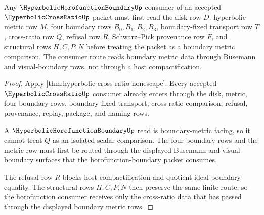 \begin{theorem}
\label{thm:hyperbolic-cross-ratio-horofunction-consumer-route}
Any $\HyperbolicHorofunctionBoundaryUp$ consumer of an accepted $\HyperbolicCrossRatioUp$ packet must first read the disk row $D$, hyperbolic metric row $M$, four boundary rows $B_0,B_1,B_2,B_3$, boundary-fixed transport row $T$, cross-ratio row $Q$, refusal row $R$, Schwarz--Pick provenance row $F$, and structural rows $H,C,P,N$ before treating the packet as a boundary metric comparison. The consumer route reads boundary metric data through Busemann and visual-boundary rows, not through a host compactification.
\end{theorem}
\begin{proof}
Apply \autoref{thm:hyperbolic-cross-ratio-nonescape}. Every accepted $\HyperbolicCrossRatioUp$ consumer already enters through the disk, metric, four boundary rows, boundary-fixed transport, cross-ratio comparison, refusal, provenance, replay, package, and naming rows.

A $\HyperbolicHorofunctionBoundaryUp$ read is boundary-metric facing, so it cannot treat $Q$ as an isolated scalar comparison. The four boundary rows and the metric row must first be routed through the displayed Busemann and visual-boundary surfaces that the horofunction-boundary packet consumes.

The refusal row $R$ blocks host compactification and quotient ideal-boundary equality. The structural rows $H,C,P,N$ then preserve the same finite route, so the horofunction consumer receives only the cross-ratio data that has passed through the displayed boundary metric rows.
\end{proof}




